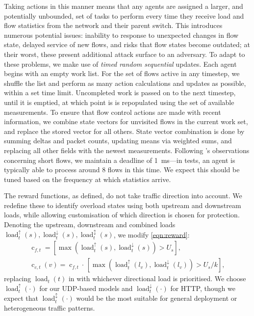\documentclass[conference, letterpaper, 10pt, times]{IEEEtran}
\newcommand{\fakepara}[1]{\noindent\textbf{#1:}}
\begin{document}
Taking actions in this manner means that any agents are assigned a larger, and potentially unbounded, set of tasks to perform every time they receive load and flow statistics from the network and their parent switch.
This introduces numerous potential issues: inability to response to unexpected changes in flow state, delayed service of new flows, and risks that flow states become outdated; at their worst, these present additional attack surface to an adversary.
To adapt to these problems, we make use of \emph{timed random sequential} updates.
Each agent begins with an empty work list.
For the set of flows active in any timestep, we shuffle the list and perform as many action calculations and updates as possible, within a set time limit.
Uncompleted work is passed on to the next timestep, until it is emptied, at which point is is repopulated using the set of available measurements.
To ensure that flow control actions are made with recent information, we combine state vectors for unvisited flows in the current work set, and replace the stored vector for all others.
State vector combination is done by summing deltas and packet counts, updating means via weighted sums, and replacing all other fields with the newest measurements.
Following \textcite{DBLP:conf/sigcomm/ChenL0L18}'s observations concerning short flows, we maintain a deadline of \SI{1}{\milli\second}---in tests, an agent is typically able to process around 8 flows in this time.
We expect this should be tuned based on the frequency at which statistics arrive.

\newcommand{\arrload}[2]{\operatorname{load}^{#2}_{t}(#1)}
\newcommand{\uload}[1]{\arrload{#1}{\uparrow}}
\newcommand{\dload}[1]{\arrload{#1}{\downarrow}}
\newcommand{\bload}[1]{\arrload{#1}{\updownarrow}}
\newcommand{\cond}[2]{\operatorname{c}_{#1,t}#2}
The reward functions, as defined, do not take traffic direction into account.
We redefine these to identify overload states using both upstream and downstream loads, while allowing customisation of which direction is chosen for protection.
Denoting the upstream, downstream and combined loads $\uload{s}, \dload{s}, \bload{s}$, we modify \cref{eqn:reward}:
\begin{subequations}
\begin{gather}
\cond{f} = [\max(\uload{s}, \dload{s}) > U_s],\\
\cond{c}{(v)} = \cond{f}{} \cdot{} \, [\max(\uload{l_v}, \dload{l_v}) > U_s/k],
\end{gather}
\label{eqn:reward-but-better}
\end{subequations}
replacing $\arrload{t}{}$ in  with whichever directional load is prioritised.
We choose $\uload{\cdot}$ for our UDP-based models and $\dload{\cdot}$ for HTTP, though we expect that $\bload{\cdot}$ would be the most suitable for general deployment or heterogeneous traffic patterns.
\end{document}
